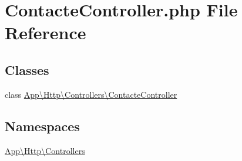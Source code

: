 \hypertarget{_contacte_controller_8php}{}\section{Contacte\+Controller.\+php File Reference}
\label{_contacte_controller_8php}
\subsection*{Classes}
\begin{DoxyCompactItemize}
\item 
class \mbox{\hyperlink{class_app_1_1_http_1_1_controllers_1_1_contacte_controller}{App\textbackslash{}\+Http\textbackslash{}\+Controllers\textbackslash{}\+Contacte\+Controller}}
\end{DoxyCompactItemize}
\subsection*{Namespaces}
\begin{DoxyCompactItemize}
\item 
 \mbox{\hyperlink{namespace_app_1_1_http_1_1_controllers}{App\textbackslash{}\+Http\textbackslash{}\+Controllers}}
\end{DoxyCompactItemize}
